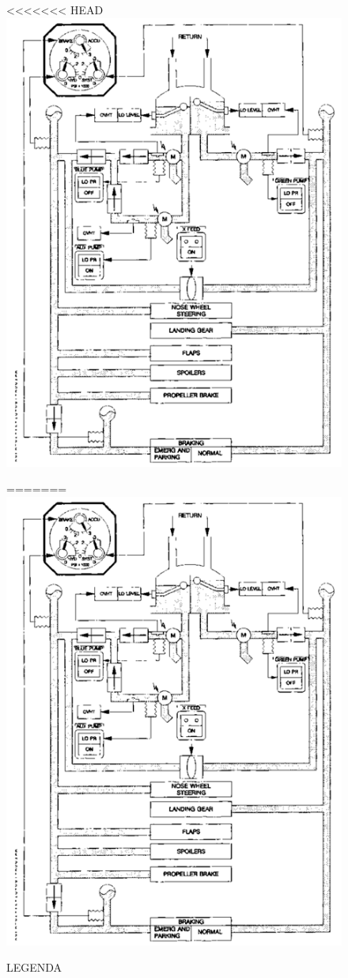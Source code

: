 \begin{figure}
<<<<<<< HEAD
\centering
\includegraphics{images/parte3/sistemas_hidraulico.png}
\caption{LEGENDA}
=======
\includegraphics[width=\textwidth]{images/parte3/sistemas_hidraulico.png}

\end{figure}
